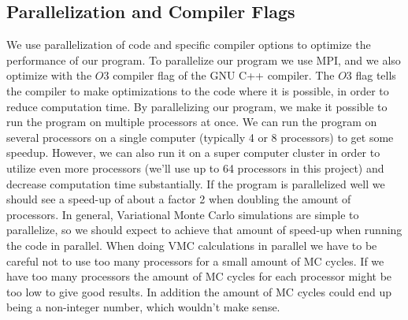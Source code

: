 \documentclass[../main.tex]{subfiles}
\begin{document}
\subsection{Parallelization and Compiler Flags}


We use parallelization of code and specific compiler options to optimize the performance of our program. To parallelize our program we use MPI, and we also optimize with the $O3$ compiler flag of the GNU C++ compiler. The $O3$ flag tells the compiler to make optimizations to the code where it is possible, in order to reduce computation time. By parallelizing our program, we make it possible to run the program on multiple processors at once. We can run the program on several processors on a single computer (typically 4 or 8 processors) to get some speedup. However, we can also run it on a super computer cluster in order to utilize even more processors (we'll use up to 64 processors in this project) and decrease computation time substantially. If the program is parallelized well we should see a speed-up of about a factor 2 when doubling the amount of processors. In general, Variational Monte Carlo simulations are simple to parallelize, so we should expect to achieve that amount of speed-up when running the code in parallel. When doing VMC calculations in parallel we have to be careful not to use too many processors for a small amount of MC cycles. If we have too many processors the amount of MC cycles for each processor might be too low to give good results. In addition the amount of MC cycles could end up being a non-integer number, which wouldn't make sense.
\end{document}
